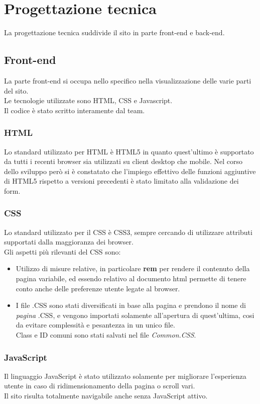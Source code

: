 \section{Progettazione tecnica}
La progettazione tecnica suddivide il sito in parte front-end e back-end.
\subsection{Front-end}

La parte front-end si occupa nello specifico nella visualizzazione delle varie parti del sito.\\
Le tecnologie utilizzate sono HTML, CSS e Javascript.\\
Il codice è stato scritto interamente dal team.

\subsubsection{HTML}

Lo standard utilizzato per HTML è HTML5 in quanto quest’ultimo è supportato da tutti i recenti browser sia utilizzati su client desktop che mobile. 
Nel corso dello sviluppo però si è constatato che l’impiego effettivo delle funzioni aggiuntive di HTML5 rispetto a versioni precedenti è stato limitato alla validazione dei form.

\subsubsection{CSS}
Lo standard utilizzato per il CSS è CSS3, sempre cercando di utilizzare attributi supportati dalla maggioranza dei browser.\\
Gli aspetti più rilevanti del CSS sono:
\begin{itemize}
	\item Utilizzo di misure relative, in particolare \textbf{rem} per rendere il contenuto della pagina variabile, ed essendo relativo al documento html permette di tenere conto anche delle preferenze utente legate al browser.
	\item I file .CSS sono stati diversificati in base alla pagina e prendono il nome di \textit{pagina} .CSS, e vengono importati solamente all'apertura di quest'ultima, cosi da evitare complessità e pesantezza in un unico file.\\Class e ID comuni sono stati salvati nel file \textit{Common.CSS}.
\end{itemize}

\subsubsection{JavaScript}
Il linguaggio JavaScript è stato utilizzato solamente per migliorare l'esperienza utente in caso di ridimensionamento della pagina o scroll vari.\\ Il sito risulta totalmente navigabile anche senza JavaScript attivo.
\newpage

